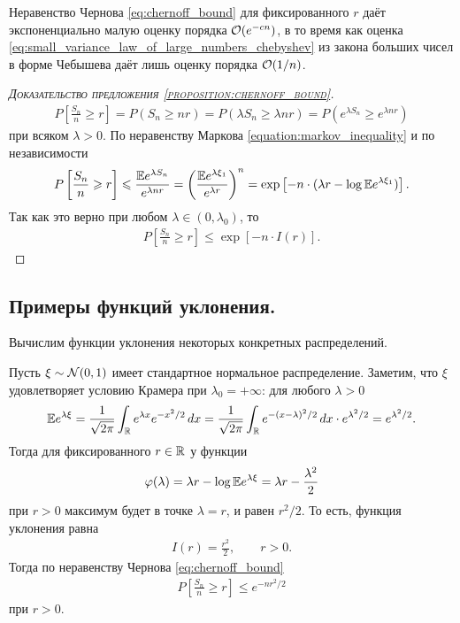 \documentclass[../main.tex]{subfiles}
\begin{document}
Неравенство Чернова \eqref{eq:chernoff_bound} для фиксированного $ r $ даёт экспоненциально малую оценку порядка $ \mathcal{O}(e^{-cn}) $, в то время как оценка \eqref{eq:small_variance_law_of_large_numbers_chebyshev} из закона больших чисел в форме Чебышева даёт лишь оценку порядка $ \mathcal{O}(1 / n) $.

\begin{proof}[\normalfont\textsc{Доказательство предложения \ref{proposition:chernoff_bound}}]
 \begin{align*}
  P \left[ \frac{S_n}{n} \geqslant r \right] = P(S_n \geqslant nr) = P(\lambda S_n \geqslant \lambda n r) = P(e^{\lambda S_n} \geqslant e^{\lambda n r})
 \end{align*} при всяком $ \lambda > 0 $. По неравенству Маркова \eqref{equation:markov_inequality} и по независимости
 \begin{align*}
  P \left[ \frac{S_n}{n} \geqslant r \right] \leqslant \frac{\mathbb E e^{\lambda S_n}}{e^{\lambda n r}} = \left( \frac{\mathbb E e^{\lambda \xi_1}}{e^{\lambda r}} \right)^{n} = \exp \left[ -n \cdot (\lambda r - \log \mathbb E e^{\lambda\xi_1}) \right].
 \end{align*} Так как это верно при любом $ \lambda \in (0,\lambda_0) $, то
 \begin{align*}
  P \left[ \frac{S_n}{n} \geqslant r \right] \leqslant \exp \left[ -n \cdot I(r) \right].
 \end{align*}
\end{proof}

\subsection{Примеры функций уклонения.}

Вычислим функции уклонения некоторых конкретных распределений.

\begin{exmpl}
 Пусть $ \xi \sim \mathcal N(0, 1) $ имеет стандартное нормальное распределение. Заметим, что $ \xi $  удовлетворяет условию Крамера при $ \lambda_0 = +\infty $: для любого $ \lambda > 0 $
 \begin{align*}
  \mathbb E e^{\lambda \xi} = \frac{1}{\sqrt{2\pi}} \int_{\mathbb{R}} e^{\lambda x}  e^{-x^{2} / 2}\,dx = \frac{1}{\sqrt{2\pi}} \int_{\mathbb{R}} e^{-(x-\lambda)^{2} / 2}\,dx \cdot e^{\lambda^{2} / 2} = e^{\lambda^{2} / 2}.
 \end{align*} Тогда для фиксированного $ r\in\mathbb{R} $ у функции
 \begin{align*}
  \varphi(\lambda) = \lambda r - \log \mathbb E e^{\lambda \xi}  = \lambda r - \frac{\lambda^{2}}{2}
 \end{align*} при $ r > 0 $ максимум будет в точке $ \lambda = r $, и равен  $ r^{2}  / 2$. То есть, функция уклонения равна
 \begin{align*}
  I(r) = \frac{r^{2}}{2}, \qquad r > 0.
 \end{align*} Тогда по неравенству Чернова \eqref{eq:chernoff_bound}
 \begin{align*}
  P \left[ \frac{S_n}{n} \geqslant r \right] \leqslant e^{-nr^{2} / 2}
 \end{align*} при $ r > 0 $.
\end{exmpl}
\end{document}
